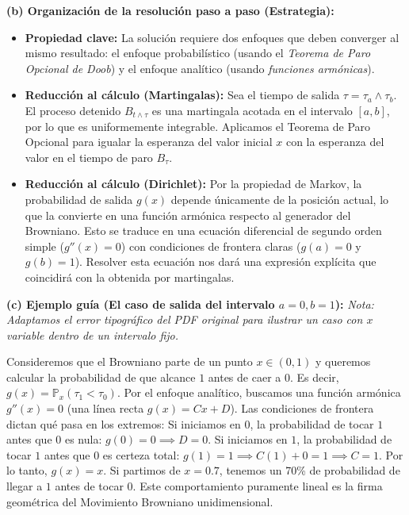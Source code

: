 \documentclass[11pt, letterpaper]{article}
\begin{document}
   \vspace{5mm}

\begin{solucion}
    \textbf{(b) Organización de la resolución paso a paso (Estrategia):}
    \begin{itemize}
        \item[(i)] \textbf{Propiedad clave:} La solución requiere dos enfoques que deben converger al mismo resultado: el enfoque probabilístico (usando el \textit{Teorema de Paro Opcional de Doob}) y el enfoque analítico (usando \textit{funciones armónicas}).
        \item[(ii)] \textbf{Reducción al cálculo (Martingalas):} Sea el tiempo de salida $\tau = \tau_a \wedge \tau_b$. El proceso detenido $B_{t \wedge \tau}$ es una martingala acotada en el intervalo $[a, b]$, por lo que es uniformemente integrable. Aplicamos el Teorema de Paro Opcional para igualar la esperanza del valor inicial $x$ con la esperanza del valor en el tiempo de paro $B_\tau$.
        \item[(iii)] \textbf{Reducción al cálculo (Dirichlet):} Por la propiedad de Markov, la probabilidad de salida $g(x)$ depende únicamente de la posición actual, lo que la convierte en una función armónica respecto al generador del Browniano. Esto se traduce en una ecuación diferencial de segundo orden simple ($g''(x) = 0$) con condiciones de frontera claras ($g(a) = 0$ y $g(b) = 1$). Resolver esta ecuación nos dará una expresión explícita que coincidirá con la obtenida por martingalas.
    \end{itemize}

    \vspace{3mm}
    \textbf{(c) Ejemplo guía (El caso de salida del intervalo $a=0, b=1$):}
    \textit{Nota: Adaptamos el error tipográfico del PDF original para ilustrar un caso con $x$ variable dentro de un intervalo fijo.}
    
    Consideremos que el Browniano parte de un punto $x \in (0, 1)$ y queremos calcular la probabilidad de que alcance $1$ antes de caer a $0$. Es decir, $g(x) = \mathbb{P}_x(\tau_1 < \tau_0)$.
    Por el enfoque analítico, buscamos una función armónica $g''(x) = 0$ (una línea recta $g(x) = Cx + D$).
    Las condiciones de frontera dictan qué pasa en los extremos:
    Si iniciamos en $0$, la probabilidad de tocar $1$ antes que $0$ es nula: $g(0) = 0 \implies D = 0$.
    Si iniciamos en $1$, la probabilidad de tocar $1$ antes que $0$ es certeza total: $g(1) = 1 \implies C(1) + 0 = 1 \implies C = 1$.
    Por lo tanto, $g(x) = x$. Si partimos de $x = 0.7$, tenemos un 70\% de probabilidad de llegar a $1$ antes de tocar $0$. Este comportamiento puramente lineal es la firma geométrica del Movimiento Browniano unidimensional.


\end{solucion}
\end{document}
